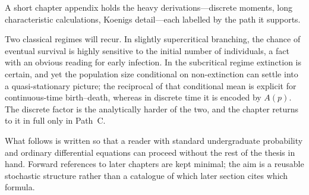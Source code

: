 \noindent
A short chapter appendix holds the heavy derivations---discrete moments, long characteristic calculations, Koenigs detail---each labelled by the path it supports.

Two classical regimes will recur. In slightly supercritical branching, the chance of eventual survival is highly sensitive to the initial number of individuals, a fact with an obvious reading for early infection. In the subcritical regime extinction is certain, and yet the population size conditional on non-extinction can settle into a quasi-stationary picture; the reciprocal of that conditional mean is explicit for continuous-time birth--death, whereas in discrete time it is encoded by $A(p)$. The discrete factor is the analytically harder of the two, and the chapter returns to it in full only in Path~C.

What follows is written so that a reader with standard undergraduate probability and ordinary differential equations can proceed without the rest of the thesis in hand. Forward references to later chapters are kept minimal; the aim is a reusable stochastic structure rather than a catalogue of which later section cites which formula.
